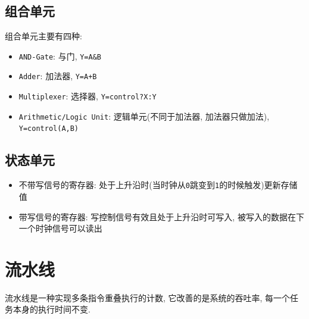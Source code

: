\subsection{组合单元}
组合单元主要有四种:
\begin{itemize}
\item \verb|AND-Gate|: 与门, \verb|Y=A&B|
\item \verb|Adder|: 加法器, \verb|Y=A+B|
\item \verb|Multiplexer|: 选择器, \verb|Y=control?X:Y|
\item \verb|Arithmetic/Logic Unit|: 逻辑单元(不同于加法器, 加法器只做加法), \verb|Y=control(A,B)|
\end{itemize}
\subsection{状态单元}
\begin{itemize}
\item 不带写信号的寄存器: 处于上升沿时(当时钟从\verb|0|跳变到\verb|1|的时候触发)更新存储值
\item 带写信号的寄存器: 写控制信号有效且处于上升沿时可写入, 被写入的数据在下一个时钟信号可以读出
\end{itemize}
\section{流水线}
流水线是一种实现多条指令重叠执行的计数, 它改善的是系统的吞吐率, 每一个任务本身的执行时间不变. \par
